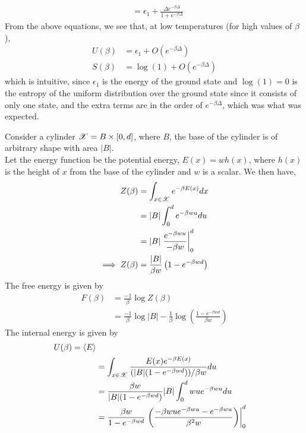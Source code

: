 \documentclass[letterpaper,english,10pt]{article}
\begin{document}
\begin{exmp}
\begin{align}
	&= \epsilon_1 + \frac{\Delta e^{-\beta \Delta}}{1 + e^{-\beta \Delta}}
\end{align}
From the above equations, we see that, at low temperatures (for high values of $\beta$),
\begin{align}
U(\beta) &= \epsilon_1 + O(e^{-\beta \Delta}) \\
S(\beta) &= \log (1) + O(e^{-\beta \Delta})
\end{align}
which is intuitive, since $\epsilon_1$ is the energy of the ground state and $\log(1) = 0$ is the entropy of the uniform distribution over the ground state since it consists of only one state, and the extra terms are in the order of $e^{-\beta \Delta}$, which was what was expected.
\end{exmp}
\begin{exmp}[Cylinder]
Consider a cylinder $\mathscr{X} = B \times [0,d]$, where $B$, the base of the cylinder is of arbitrary shape with area $|B|$.\\
Let the energy function be the potential energy, $E(x) = wh(x)$, where $h(x)$ is the height of $x$ from the base of the cylinder and $w$ is a scalar. We then have,
\begin{align}
Z(\beta) &= \int_{x \in \mathscr{X}} e^{-\beta E(x)} dx \nonumber \\
	&= |B| \int_0^d e^{-\beta w u} du \nonumber \\
	&= |B| \left. \frac{e^{-\beta w u}}{- \beta w} \right|_0^d \nonumber \\
\implies Z(\beta) &= \frac{|B|}{\beta w} \left( 1 - e^{-\beta w d} \right)
\end{align}
The free energy is given by
\begin{align}
F(\beta) &= \frac{-1}{\beta} \log Z(\beta) \nonumber \\
	&= \frac{-1}{\beta} \log |B| - \frac{1}{\beta} \log \left( \frac{1 - e^{-\beta wd}}{\beta w} \right)
\end{align}
The internal energy is given by
\begin{align}
U(\beta) = \left\langle E \right\rangle \nonumber \\
	&= \int_{x \in \sX} \frac{E(x) e^{- \beta E(x)}}{(|B|(1 - e^{-\beta wd}))/\beta w} du \nonumber \\
	&= \frac{\beta w}{|B|(1 - e^{-\beta wd})} |B| \int_0^d wu e^{-\beta wu} du \nonumber \\
	&= \frac{\beta w}{1 - e^{-\beta wd}} \left. \left( \frac{-\beta wu e^{-\beta wu} - e^{-\beta wu}}{\beta^2 w} \right) \right|_0^d \nonumber \\

\end{align}
\end{exmp}
\end{document}
